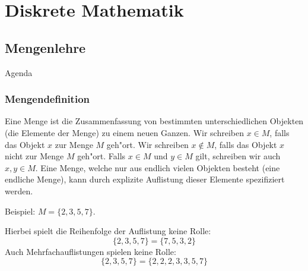 \documentclass{beamer}
\begin{document}
\section{Diskrete Mathematik}
\subsection{Mengenlehre}
\begin{frame}{Agenda}
   
    
  \tableofcontents[currentsection]
  \end{frame}
\begin{frame}
  \frametitle{Mengendefinition}
  \begin{definition}
    Eine Menge ist die Zusammenfassung von bestimmten unterschiedlichen
    Objekten (die Elemente der Menge) zu einem neuen Ganzen.
    Wir schreiben $x\in M$, falls das Objekt $x$ zur Menge $M$ geh"ort.
    Wir schreiben $x\notin M$, falls das Objekt $x$ nicht zur Menge $M$ geh"ort.
    Falls $x\in M$ und $y\in M$ gilt, schreiben wir auch $x, y \in M$.
    Eine Menge, welche nur aus endlich vielen Objekten besteht (eine endliche
    Menge), kann durch explizite Auflistung dieser Elemente spezifiziert
    werden.
  \end{definition}
    Beispiel: $M=\{2,3,5,7\}$.

    Hierbei spielt die Reihenfolge der Auflistung keine Rolle:
    \[\{2,3,5,7\}=\{7,5,3,2\}\]
    Auch Mehrfachauflistungen spielen keine Rolle:
    \[\{2,3,5,7\}=\{2,2,2,3,3,5,7\}\]
  \end{frame}
\end{document}
